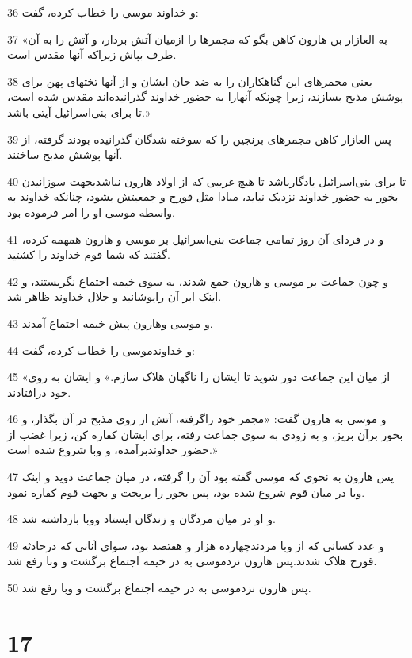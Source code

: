 \par 36 و خداوند موسی را خطاب کرده، گفت:
\par 37 «به العازار بن هارون کاهن بگو که مجمرها را ازمیان آتش بردار، و آتش را به آن طرف بپاش زیراکه آنها مقدس است.
\par 38 یعنی مجمرهای این گناهکاران را به ضد جان ایشان و از آنها تختهای پهن برای پوشش مذبح بسازند، زیرا چونکه آنهارا به حضور خداوند گذرانیده‌اند مقدس شده است، تا برای بنی‌اسرائیل آیتی باشد.»
\par 39 پس العازار کاهن مجمرهای برنجین را که سوخته شدگان گذرانیده بودند گرفته، از آنها پوشش مذبح ساختند.
\par 40 تا برای بنی‌اسرائیل یادگارباشد تا هیچ غریبی که از اولاد هارون نباشدبجهت سوزانیدن بخور به حضور خداوند نزدیک نیاید، مبادا مثل قورح و جمعیتش بشود، چنانکه خداوند به واسطه موسی او را امر فرموده بود.
\par 41 و در فردای آن روز تمامی جماعت بنی‌اسرائیل بر موسی و هارون همهمه کرده، گفتند که شما قوم خداوند را کشتید.
\par 42 و چون جماعت بر موسی و هارون جمع شدند، به سوی خیمه اجتماع نگریستند، و اینک ابر آن راپوشانید و جلال خداوند ظاهر شد.
\par 43 و موسی وهارون پیش خیمه اجتماع آمدند.
\par 44 و خداوندموسی را خطاب کرده، گفت:
\par 45 «از میان این جماعت دور شوید تا ایشان را ناگهان هلاک سازم.» و ایشان به روی خود درافتادند.
\par 46 و موسی به هارون گفت: «مجمر خود راگرفته، آتش از روی مذبح در آن بگذار، و بخور برآن بریز، و به زودی به سوی جماعت رفته، برای ایشان کفاره کن، زیرا غضب از حضور خداوندبرآمده، و وبا شروع شده است.»
\par 47 پس هارون به نحوی که موسی گفته بود آن را گرفته، در میان جماعت دوید و اینک وبا در میان قوم شروع شده بود، پس بخور را بریخت و بجهت قوم کفاره نمود.
\par 48 و او در میان مردگان و زندگان ایستاد ووبا بازداشته شد.
\par 49 و عدد کسانی که از وبا مردندچهارده هزار و هفتصد بود، سوای آنانی که درحادثه قورح هلاک شدند.پس هارون نزدموسی به در خیمه اجتماع برگشت و وبا رفع شد.
\par 50 پس هارون نزدموسی به در خیمه اجتماع برگشت و وبا رفع شد.
 
\chapter{17}

